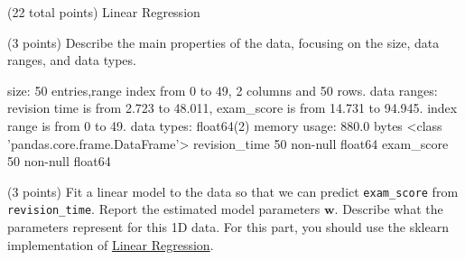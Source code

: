 \documentclass[12pt]{article}
\begin{document}
\maketitle
\thispagestyle{empty}







\clearpage

\begin{question}{(22 total points) Linear Regression}




%
%
\begin{subquestion}{(3 points) Describe the main properties of the data, focusing on the size, data ranges, and data types.   
}


\begin{answerbox}{10em}
size: 50 entries,range index from 0 to 49, 2 columns and 50 rows.
data ranges: revision time is from 2.723 to 48.011, exam_score is from 14.731 to 94.945. index range is from 0 to 49.
data types: float64(2)
memory usage: 880.0 bytes
<class 'pandas.core.frame.DataFrame'>
revision_time    50 non-null float64
exam_score       50 non-null float64
\end{answerbox}



\end{subquestion}




%
%
\begin{subquestion}{(3 points) Fit a linear model to the data so that we can predict \texttt{exam\_score} from \texttt{revision\_time}. 
Report the estimated model parameters $\mathbf{w}$. 
Describe what the parameters represent for this 1D data. 
For this part, you should use the sklearn implementation of \href{https://scikit-learn.org/0.19/modules/generated/sklearn.linear_model.LinearRegression.html}{Linear Regression}.\\
}



\end{subquestion}
\end{question}
\end{document}
